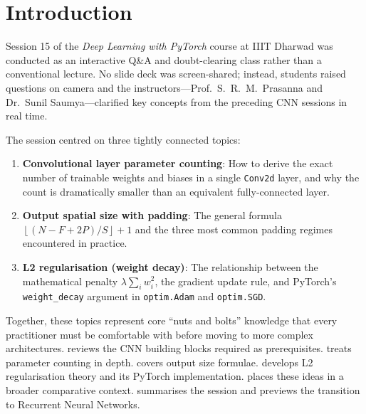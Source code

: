 \documentclass[12pt,a4paper]{article}
\newcommand{\floor}[1]{\left\lfloor #1 \right\rfloor}
\begin{document}
\section{Introduction}
\label{sec:intro}

Session 15 of the \emph{Deep Learning with PyTorch} course at IIIT Dharwad
was conducted as an interactive Q\&A and doubt-clearing class rather than a
conventional lecture. No slide deck was screen-shared; instead, students
raised questions on camera and the instructors---Prof.\ S.~R.~M.\ Prasanna
and Dr.\ Sunil Saumya---clarified key concepts from the preceding CNN
sessions in real time.

The session centred on three tightly connected topics:

\begin{enumerate}[label=\textbf{(\arabic*)}]
  \item \textbf{Convolutional layer parameter counting}: How to derive the
        exact number of trainable weights and biases in a single
        \texttt{Conv2d} layer, and why the count is dramatically smaller
        than an equivalent fully-connected layer.
  \item \textbf{Output spatial size with padding}: The general formula
        $\floor{(N - F + 2P)/S} + 1$ and the three most common padding
        regimes encountered in practice.
  \item \textbf{L2 regularisation (weight decay)}: The relationship between
        the mathematical penalty $\lambda \sum_i w_i^2$, the gradient update
        rule, and PyTorch's \texttt{weight\_decay} argument in
        \texttt{optim.Adam} and \texttt{optim.SGD}.
\end{enumerate}

Together, these topics represent core ``nuts and bolts'' knowledge that
every practitioner must be comfortable with before moving to more complex
architectures.  reviews the CNN building blocks
required as prerequisites.  treats parameter counting
in depth.  covers output size formulae.
 develops L2 regularisation theory and its PyTorch
implementation.  places these ideas in a broader
comparative context.  summarises the session and
previews the transition to Recurrent Neural Networks.
\end{document}
